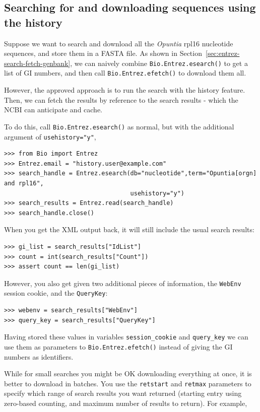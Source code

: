 \documentclass{report}
\begin{document}
\subsection{Searching for and downloading sequences using the history}
Suppose we want to search and download all the \textit{Opuntia} rpl16
nucleotide sequences, and store them in a FASTA file.  As shown in
Section~\ref{sec:entrez-search-fetch-genbank}, we can naively combine
\verb|Bio.Entrez.esearch()| to get a list of GI numbers, and then call
\verb|Bio.Entrez.efetch()| to download them all.

However, the approved approach is to run the search with the history
feature.  Then, we can fetch the results by reference to the search
results - which the NCBI can anticipate and cache.

To do this, call \verb|Bio.Entrez.esearch()| as normal, but with the
additional argument of \verb|usehistory="y"|,

\begin{verbatim}
>>> from Bio import Entrez
>>> Entrez.email = "history.user@example.com"
>>> search_handle = Entrez.esearch(db="nucleotide",term="Opuntia[orgn] and rpl16",
                                   usehistory="y")
>>> search_results = Entrez.read(search_handle)
>>> search_handle.close()
\end{verbatim}

\noindent When you get the XML output back, it will still include the usual search results:

\begin{verbatim}
>>> gi_list = search_results["IdList"]
>>> count = int(search_results["Count"])
>>> assert count == len(gi_list)
\end{verbatim}

\noindent However, you also get given two additional pieces of information, the {\tt WebEnv} session cookie, and the {\tt QueryKey}:

\begin{verbatim}
>>> webenv = search_results["WebEnv"]
>>> query_key = search_results["QueryKey"] 
\end{verbatim}

Having stored these values in variables {\tt session\_cookie} and {\tt query\_key} we can use them as parameters to \verb|Bio.Entrez.efetch()| instead of giving the GI numbers as identifiers.  

While for small searches you might be OK downloading everything at once, it is better to download in batches.  You use the {\tt retstart} and {\tt retmax} parameters to specify which range of search results you want returned (starting entry using zero-based counting, and maximum number of results to return).  For example,
\end{document}

